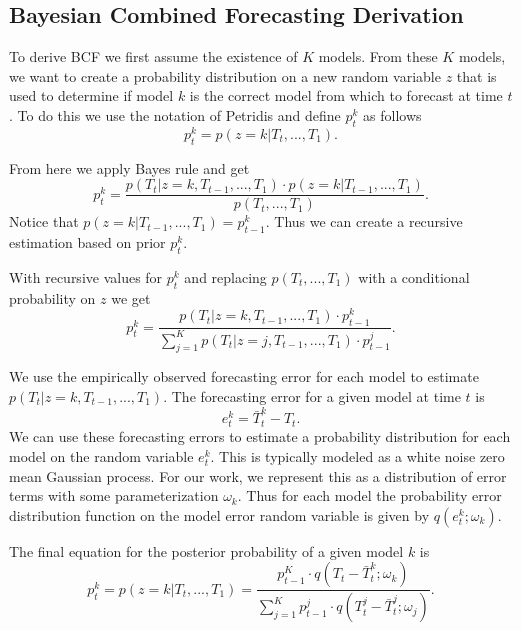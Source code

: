 \subsection{Bayesian Combined Forecasting Derivation}
To derive BCF we first assume the existence of $K$ models.  From these $K$ models, we want to create a probability distribution on a new random variable $z$ that is used to determine if model $k$ is the correct model from which to forecast at time $t$.  To do this we use the notation of Petridis \cite{Petridis2001} and define $p_{t}^{k}$ as follows
\begin{equation}
p_{t}^{k} = p(z = k | T_{t}, ..., T_{1}).
\end{equation}

From here we apply Bayes rule and get
\begin{equation}
p_{t}^{k} = \frac{p(T_{t} | z = k, T_{t - 1}, ..., T_{1}) \cdot p(z = k | T_{t - 1}, ..., T_{1})} {p(T_{t}, ..., T_{1})}.
\end{equation}
\noindent
Notice that $p(z = k | T_{t - 1}, ..., T_{1}) = p_{t - 1}^{k}$.  Thus we can create a recursive estimation based on prior $p_{t}^{k}$.

With recursive values for $p_{t}^{k}$ and replacing $p(T_{t}, ..., T_{1})$ with a conditional probability on $z$ we get
\begin{equation}
p_{t}^{k} = \frac{p(T_{t} | z = k, T_{t - 1}, ..., T_{1}) \cdot p_{t - 1}^{k}} {\sum_{j = 1}^{K}p(T_{t} | z = j, T_{t - 1}, ..., T_{1}) \cdot p_{t - 1}^{j}}.
\end{equation}

We use the empirically observed forecasting error for each model to estimate $p(T_{t}|z = k, T_{t - 1}, ..., T_{1})$.  The forecasting error for a given model at time $t$ is 
\begin{equation}
e_{t}^{k} = \bar{T}_{t}^{k} - T_{t}.
\end{equation}
\noindent
We can use these forecasting errors to estimate a probability distribution for each model on the random variable $e_{t}^{k}$.  This is typically modeled as a white noise zero mean Gaussian process.  For our work, we represent this as a distribution of error terms with some parameterization $\omega_{k}$.  Thus for each model the probability error distribution function on the model error random variable is given by $q(e_{t}^{k};\omega_{k})$.

The final equation for the posterior probability of a given model $k$ is
\begin{equation}
\label{eq:model_prob}
p_{t}^{k} = p(z = k|T_{t}, ..., T_{1}) = \frac{p_{t - 1}^{K} \cdot q(T_{t} - \bar{T}_{t}^{k}; \omega_{k})}{\sum_{j=1}^{K}p_{t - 1}^{j} \cdot q(T_{t}^{j} - \bar{T}_{t}^{j}; \omega_{j})}.
\end{equation}

